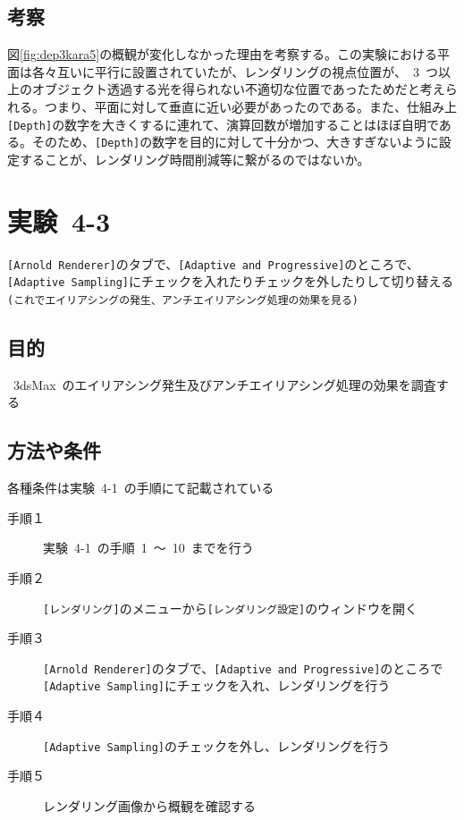 \documentclass[a4j]{jarticle}
\begin{document}
\subsection{考察}
%
図\ref{fig:dep3kara5}の概観が変化しなかった理由を考察する。この実験における平面は各々互いに平行に設置されていたが、レンダリングの視点位置が、\ 3\ つ以上のオブジェクト透過する光を得られない不適切な位置であったためだと考えられる。つまり、平面に対して垂直に近い必要があったのである。また、仕組み上\verb|[Depth]|の数字を大きくするに連れて、演算回数が増加することはほぼ自明である。そのため、\verb|[Depth]|の数字を目的に対して十分かつ、大きすぎないように設定することが、レンダリング時間削減等に繋がるのではないか。
%

\newpage
\section{実験\ 4-3}
\verb|[Arnold Renderer]|のタブで、\verb|[Adaptive and Progressive]|のところで、\verb|[Adaptive Sampling]|にチェックを入れたりチェックを外したりして切り替える\verb|(これでエイリアシングの発生、アンチエイリアシング処理の効果を見る)|
\subsection{目的}
%
\ 3dsMax\ のエイリアシング発生及びアンチエイリアシング処理の効果を調査する
%
\subsection{方法や条件}
%
各種条件は実験\ 4-1\ の手順にて記載されている
\begin{description}
  \item[手順１] 実験\ 4-1\ の手順\ 1\ ～\ 10\ までを行う
  \item[手順２] \verb|[レンダリング]|のメニューから\verb|[レンダリング設定]|のウィンドウを開く
  \item[手順３] \verb|[Arnold Renderer]|のタブで、\verb|[Adaptive and Progressive]|のところで\verb|[Adaptive Sampling]|にチェックを入れ、レンダリングを行う
  \item[手順４] \verb|[Adaptive Sampling]|のチェックを外し、レンダリングを行う
  \item[手順５] レンダリング画像から概観を確認する
\end{description}
%
\end{document}
